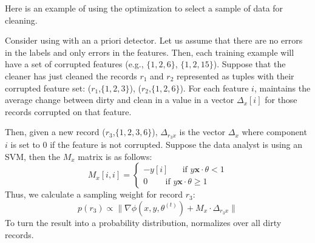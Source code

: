 Here is an example of using the optimization to select a sample of data for cleaning.
\begin{example}\label{estex}
Consider using \sys with an a priori detector.
Let us assume that there are no errors in the labels and only errors in the features.
Then, each training example will have a set of corrupted features (e.g., $\{1,2,6\}$, $\{1,2,15\}$).
Suppose that the cleaner has just cleaned the records $r_1$ and $r_2$ represented as tuples with their corrupted feature set: ($r_1$,$\{1,2,3\}$), ($r_2$,$\{1,2,6\}$).
For each feature $i$, \sys maintains the average change between dirty and clean in a value in a vector $\Delta_x[i]$ for those records corrupted on that feature. 

Then, given a new record ($r_3$,$\{1,2,3,6\}$), $\Delta_{r_3x}$ is the vector $\Delta_x$ where component $i$ is set to 0 if the feature is not corrupted.
Suppose the data analyst is using an SVM, then the $M_x$ matrix is as follows:
\[
M_x[i,i] = \begin{cases}      
-y[i] ~~~~~~\text{ if } y\boldsymbol{x}\cdot\theta < 1 \\
0\ ~~~~~~~\text{ if } y\boldsymbol{x}\cdot\theta \geq 1      
\end{cases} 
\]
Thus, we calculate a sampling weight for record $r_3$:
\[
p(r_3) \propto\|\nabla\phi(x,y,\theta^{(t)}) + M_x \cdot \Delta_{r_3x} \|
\] 
To turn the result into a probability distribution, \sys normalizes over all dirty records.
\end{example}
\fi

